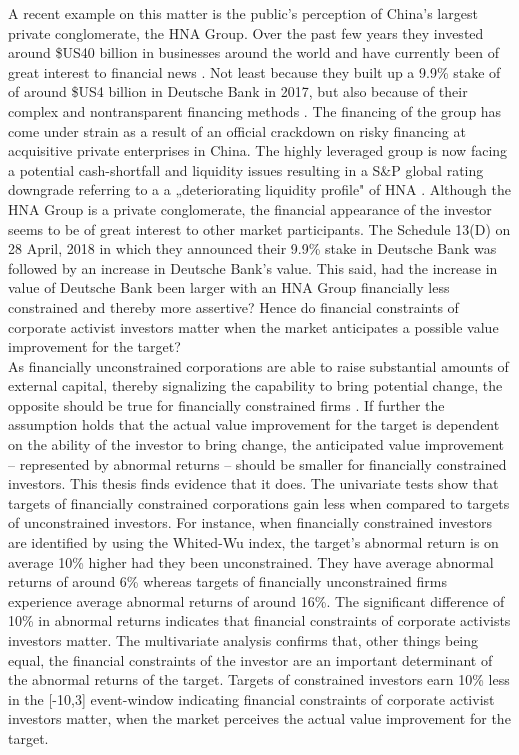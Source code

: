 \documentclass[12pt]{article}
\begin{document}
A recent example on this matter is the public's perception of China's largest private conglomerate, the HNA Group. Over the past few years they invested around \$US40 billion in businesses around the world and have currently been of great interest to financial news \citep{Smith2018}. Not least because they built up a 9.9\% stake of of around \$US4 billion in Deutsche Bank in 2017, but also because of their complex and nontransparent financing methods \citep{Lockett2018}.
The financing of the group has come under strain as a result of an official crackdown on risky financing at acquisitive private enterprises in China. The highly leveraged group is now facing a potential cash-shortfall and liquidity issues resulting in a S\&P global rating downgrade referring to a a „deteriorating liquidity profile" of HNA \citep{Schuetze2018}. Although the HNA Group is a private conglomerate, the financial appearance of the investor seems to be of great interest to other market participants. The Schedule 13(D) on 28 April, 2018 in which they announced their 9.9\% stake in Deutsche Bank was followed by an increase in Deutsche Bank's value. This said, had the increase in value of Deutsche Bank been larger with an HNA Group financially less constrained and thereby more assertive? Hence do financial constraints of corporate activist investors matter when the market anticipates a possible value improvement for the target?\\ 
As financially unconstrained corporations are able to raise substantial amounts of external capital, thereby signalizing the capability to bring potential change, the opposite should be true for financially constrained firms \citep[p.1]{Farre-mensa2013}. If further the assumption holds that the actual value improvement for the target is dependent on the ability of the investor to bring change, the anticipated value improvement -- represented by abnormal returns -- should be smaller for financially constrained investors.
This thesis finds evidence that it does. The univariate tests show that targets of financially constrained corporations gain less when compared to targets of unconstrained investors. For instance, when financially constrained investors are identified by using the Whited-Wu index, the target's abnormal return is on average 10\% higher had they been unconstrained. They have average abnormal returns of around 6\% whereas targets of financially unconstrained firms experience average abnormal returns of around 16\%. The significant difference of 10\% in abnormal returns indicates that financial constraints of corporate activists investors matter. The multivariate analysis confirms that, other things being equal, the financial constraints of the investor are an important determinant of the abnormal returns of the target. Targets of constrained investors earn 10\% less in the [-10,3] event-window indicating financial constraints of corporate activist investors matter, when the market perceives the actual value improvement for the target. 
\end{document}
